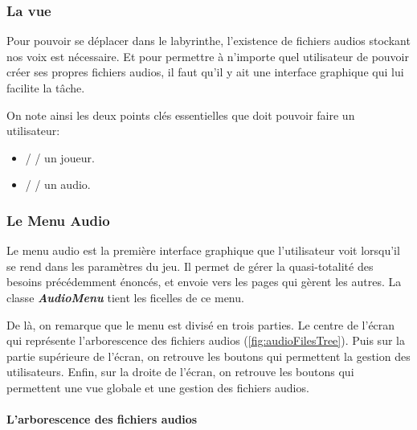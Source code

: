 \subsubsection{La vue}
\label{subsubsec:sonVue}

Pour pouvoir se déplacer dans le labyrinthe, l'existence de fichiers audios
stockant nos voix est nécessaire. Et pour permettre à n'importe quel
utilisateur de pouvoir créer ses propres fichiers audios, il faut qu'il y ait
une interface graphique qui lui facilite la tâche.

On note ainsi les deux points clés essentielles que doit pouvoir faire un
utilisateur:
\begin{itemize}
    \item{     /  /  un joueur.}
    \item{ /   /  un audio.}
\end{itemize}

\subsubsection*{Le Menu Audio}
\label{subsubsec:AudioMenu}

Le menu audio est la première interface graphique que l'utilisateur voit
lorsqu'il se rend dans les paramètres du jeu. Il permet de gérer la
quasi-totalité des besoins précédemment énoncés, et envoie vers les pages
qui gèrent les autres.
La classe \textbf{\textit{AudioMenu}} tient les ficelles de ce menu.

\begin{figure}[!htb]
    \label{fig:AudioMenu}
\end{figure}

De là, on remarque que le menu est divisé en trois parties.
Le centre de l'écran qui représente l'arborescence des fichiers audios
(\ref{fig:audioFilesTree}).
Puis sur la partie supérieure de l'écran, on retrouve les boutons qui
permettent la gestion des utilisateurs.
Enfin, sur la droite de l'écran, on retrouve les boutons qui permettent une vue
globale et une gestion des fichiers audios.

\paragraph{L'arborescence des fichiers audios}

